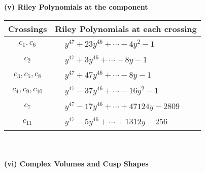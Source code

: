 \documentclass[1p]{elsarticle_modified}
\theoremstyle{definition}
\begin{document}
\newpage\renewcommand{\arraystretch}{1}
\flushleft \textbf{(v) Riley Polynomials at the component}\newline \\
\begin{tabular}{m{50pt}|m{274pt}}
Crossings & \hspace{64pt}Riley Polynomials at each crossing \\
\hline $$\begin{aligned}c_{1},c_{6}\end{aligned}$$&$\begin{aligned}
&y^{47}+23 y^{46}+\cdots-4 y^2-1
\end{aligned}$\\
\hline $$\begin{aligned}c_{2}\end{aligned}$$&$\begin{aligned}
&y^{47}+3 y^{46}+\cdots-8 y-1
\end{aligned}$\\
\hline $$\begin{aligned}c_{3},c_{5},c_{8}\end{aligned}$$&$\begin{aligned}
&y^{47}+47 y^{46}+\cdots-8 y-1
\end{aligned}$\\
\hline $$\begin{aligned}c_{4},c_{9},c_{10}\end{aligned}$$&$\begin{aligned}
&y^{47}-37 y^{46}+\cdots-16 y^2-1
\end{aligned}$\\
\hline $$\begin{aligned}c_{7}\end{aligned}$$&$\begin{aligned}
&y^{47}-17 y^{46}+\cdots+47124 y-2809
\end{aligned}$\\
\hline $$\begin{aligned}c_{11}\end{aligned}$$&$\begin{aligned}
&y^{47}-5 y^{46}+\cdots+1312 y-256
\end{aligned}$\\
\hline
\end{tabular}\\~\\
\newpage\flushleft \textbf{(vi) Complex Volumes and Cusp Shapes}
\end{document}
